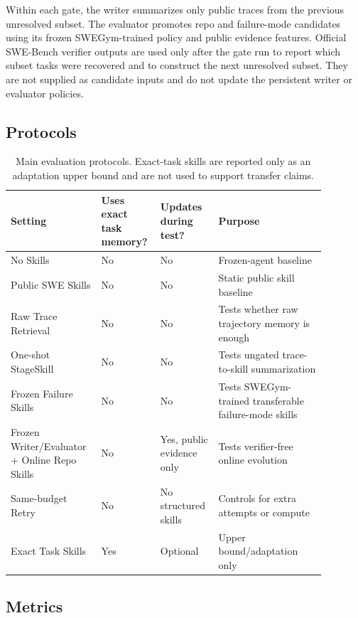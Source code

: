 \documentclass{article}
\begin{document}
Within each gate, the writer summarizes only public traces from the previous
unresolved subset. The evaluator promotes repo and failure-mode candidates using
its frozen SWEGym-trained policy and public evidence features. Official
SWE-Bench verifier outputs are used only after the gate run to report which
subset tasks were recovered and to construct the next unresolved subset. They
are not supplied as candidate inputs and do not update the persistent writer or
evaluator policies.

\subsection{Protocols}

\begin{table}[t]
\caption{Main evaluation protocols. Exact-task skills are reported only as an
adaptation upper bound and are not used to support transfer claims.}
\label{tab:protocols}
\begin{center}
\begin{tabular}{L{0.25\linewidth} C{0.15\linewidth} C{0.16\linewidth} L{0.32\linewidth}}
\toprule
Setting & Uses exact task memory? & Updates during test? & Purpose \\
\midrule
No Skills & No & No & Frozen-agent baseline \\
Public SWE Skills & No & No & Static public skill baseline \\
Raw Trace Retrieval & No & No & Tests whether raw trajectory memory is enough \\
One-shot StageSkill & No & No & Tests ungated trace-to-skill summarization \\
Frozen Failure Skills & No & No & Tests SWEGym-trained transferable failure-mode skills \\
Frozen Writer/Evaluator + Online Repo Skills & No & Yes, public evidence only & Tests verifier-free online evolution \\
Same-budget Retry & No & No structured skills & Controls for extra attempts or compute \\
Exact Task Skills & Yes & Optional & Upper bound/adaptation only \\
\bottomrule
\end{tabular}
\end{center}
\end{table}

\subsection{Metrics}
\end{document}
